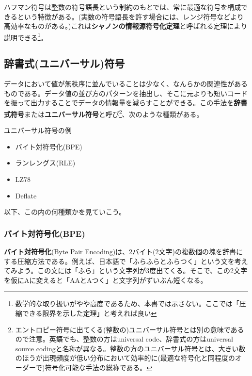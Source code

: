 ハフマン符号は整数の符号語長という制約のもとでは、常に最適な符号を構成できるという特徴がある。(実数の符号語長を許す場合には、レンジ符号などより高効率なものがある。)これは\textbf{シャノンの情報源符号化定理}と呼ばれる定理により説明できる\footnote{数学的な取り扱いがやや高度であるため、本書では示さない。ここでは「圧縮できる限界を示した定理」と考えれば良い}。

\subsection{辞書式(ユニバーサル)符号}
データにおいて値が無秩序に並んでいることは少なく、なんらかの関連性があるものである。データ値の並び方のパターンを抽出し、そこに元よりも短いコードを振って出力することでデータの情報量を減らすことができる。この手法を\textbf{辞書式符号}または\textbf{ユニバーサル符号}と呼び\footnote{エントロピー符号に出てくる(整数の)ユニバーサル符号とは別の意味であるので注意。英語でも、整数の方はuniversal code、辞書式の方はuniversal source codingと名称が異なる。整数の方のユニバーサル符号とは、大きい数のほうが出現頻度が低い分布において効率的に(最適な符号化と同程度のオーダーで)符号化可能な手法の総称である。}、次のような種類がある。
\begin{itembox}[l]{ユニバーサル符号の例}
\begin{multicols}{2}
\begin{itemize}
\item バイト対符号化(BPE)
\item ランレングス(RLE)
\item LZ78
\item Deflate
\end{itemize}
\end{multicols}
\end{itembox}

以下、この内の何種類かを見ていこう。

\subsubsection{バイト対符号化(BPE)}
\textbf{バイト対符号化}(Byte Pair Encoding)は、2バイト(2文字)の複数個の塊を辞書にする圧縮方法である。例えば、日本語で「ふらふらとふらつく」という文を考えてみよう。この文には「ふら」という文字列が3度出てくる。そこで、この2文字を仮にAに変えると「AAとAつく」と文字列がずいぶん短くなる。

